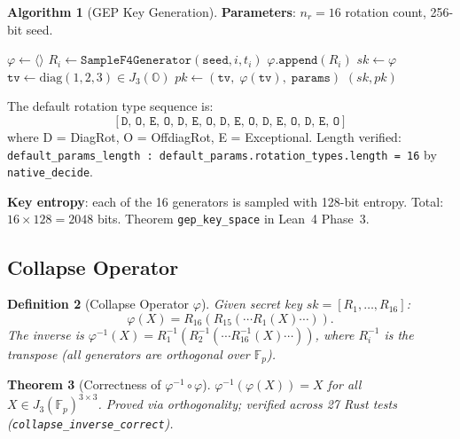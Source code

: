 \documentclass[11pt,letterpaper]{article}
\newtheorem{theorem}{Theorem}[section]
\newtheorem{definition}[theorem]{Definition}
\theoremstyle{definition}
\newtheorem{algorithm_spec}[theorem]{Algorithm}
\begin{document}
\begin{algorithm_spec}[GEP Key Generation]\label{alg:keygen}
\textbf{Parameters}: $n_r = 16$ rotation count, 256-bit seed.

\begin{algorithmic}[1]
\State $\varphi \leftarrow \langle\rangle$ 
  \State $R_i \leftarrow \mathtt{SampleF4Generator}(\mathtt{seed}, i, t_i)$
  \State $\varphi.\mathtt{append}(R_i)$
\EndFor
\State $sk \leftarrow \varphi$ 
\State $\mathtt{tv} \leftarrow \mathrm{diag}(1, 2, 3) \in J_3(\mathbb{O})$
\State $pk \leftarrow (\mathtt{tv},\; \varphi(\mathtt{tv}),\; \mathtt{params})$
\State \Return $(sk, pk)$
\end{algorithmic}
\end{algorithm_spec}

The default rotation type sequence is:
\[
[\mathtt{D,\,O,\,E,\,O,\,D,\,E,\,O,\,D,\,E,\,O,\,D,\,E,\,O,\,D,\,E,\,O}]
\]
where D = DiagRot, O = OffdiagRot, E = Exceptional. Length verified:
\texttt{default\_params\_length : default\_params.rotation\_types.length = 16}
by \texttt{native\_decide}.

\textbf{Key entropy}: each of the 16 generators is sampled with 128-bit entropy.
Total: $16 \times 128 = 2048$ bits. Theorem \texttt{gep\_key\_space} in Lean~4 Phase~3.

\subsection{Collapse Operator}

\begin{definition}[Collapse Operator $\varphi$]
Given secret key $sk = [R_1, \ldots, R_{16}]$:
\[
\varphi(X) = R_{16}(R_{15}(\cdots R_1(X)\cdots)).
\]
The inverse is $\varphi^{-1}(X) = R_1^{-1}(R_2^{-1}(\cdots R_{16}^{-1}(X)\cdots))$,
where $R_i^{-1}$ is the transpose (all generators are orthogonal over $\mathbb{F}_p$).
\end{definition}

\begin{theorem}[Correctness of $\varphi^{-1} \circ \varphi$]
$\varphi^{-1}(\varphi(X)) = X$ for all $X \in J_3(\mathbb{F}_p)^{3\times 3}$.
Proved via orthogonality; verified across 27 Rust tests
(\texttt{collapse\_inverse\_correct}).
\end{theorem}
\end{document}
